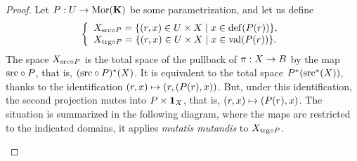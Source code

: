 \begin{proof}
  Let $\P : \U \to \Mor(\KK)$ be some parametrization,
  and let us define
  $$%
  \left\{
  \begin{array}{l}
    \X_{\source \circ \P} = \{(r,x) \in \U \times \X \mid x \in \Def(\P(r)) \}, \\
    \X_{\target \circ \P} = \{(r,x) \in \U \times \X \mid x \in \Val(\P(r)) \}.
  \end{array}
  \right.
  $$%
  The space $\X_{\source \circ \P}$ is the total space of the pullback of $\pi : \X \to \B$ by the map $\source \circ \P$,
  that is,
  $(\source \circ \P)^*(\X)$.
  It is equivalent to the total space $\P^*(\source^*(\X))$,
  thanks to the identification $(r,x) \mapsto (r,(\P(r),x))$.
  But,
  under this identification,
  the second projection mutes into $\P \times \id_\X$,
  that is,
  $(r,x) \mapsto (\P(r),x)$.
  The situation is summarized in the following diagram,
  where the maps are restricted to the indicated domains,
  it applies {\em mutatis mutandis\/} to $\X_{\target \circ \P}$.

\begin{center}
  \end{center}


\end{proof}
